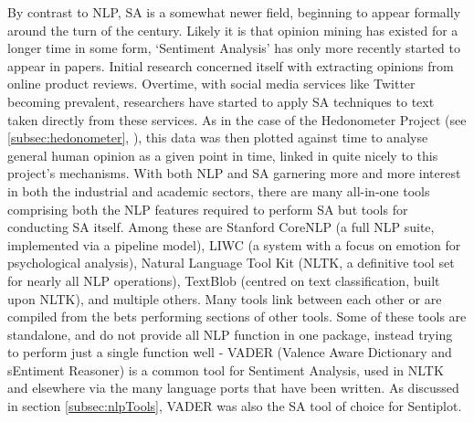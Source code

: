 \documentclass{article}
\begin{document}
        By contrast to NLP, SA is a somewhat newer field, beginning to appear formally around the turn of the century. Likely it is that opinion mining has existed for a longer time in some form, `Sentiment Analysis' has only more recently started to appear in papers. Initial research concerned itself with extracting opinions from online product reviews. Overtime, with social media services like Twitter becoming prevalent, researchers have started to apply SA techniques to text taken directly from these services. As in the case of the Hedonometer Project (see \ref{subsec:hedonometer}, \cite{reagan2016emotional}), this data was then plotted against time to analyse general human opinion as a given point in time, linked in quite nicely to this project's mechanisms.
        With both NLP and SA garnering more and more interest in both the industrial and academic sectors, there are many all-in-one tools comprising both the NLP features required to perform SA but tools for conducting SA itself. Among these are Stanford CoreNLP (a full NLP suite, implemented via a pipeline model), LIWC (a system with a focus on emotion for psychological analysis), Natural Language Tool Kit (NLTK, a definitive tool set for nearly all NLP operations), TextBlob (centred on text classification, built upon NLTK), and multiple others. Many tools link between each other or are compiled from the bets performing sections of other tools. Some of these tools are standalone, and do not provide all NLP function in one package, instead trying to perform just a single function well - VADER (Valence Aware Dictionary and sEntiment Reasoner) is a common tool for Sentiment Analysis, used in NLTK and elsewhere via the many language ports that have been written. As discussed in section \ref{subsec:nlpTools}, VADER was also the SA tool of choice for Sentiplot.
\end{document}
